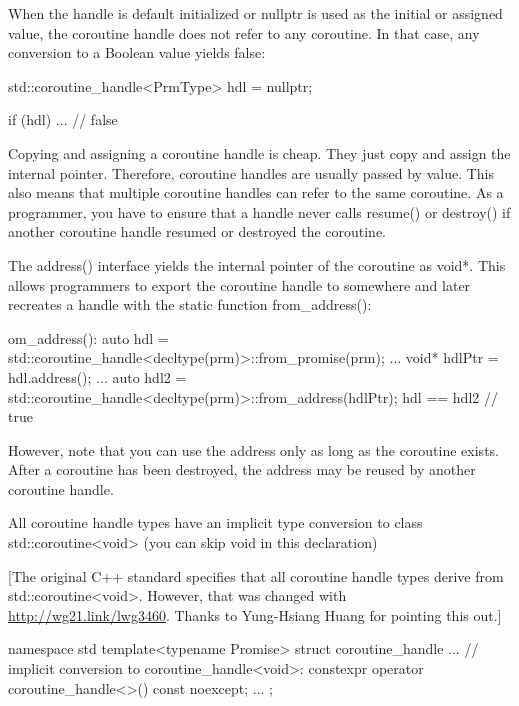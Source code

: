 When the handle is default initialized or nullptr is used as the initial or assigned value, the coroutine handle does not refer to any coroutine. In that case, any conversion to a Boolean value yields false:

\begin{cpp}
std::coroutine_handle<PrmType> hdl = nullptr;

if (hdl) ... // false
\end{cpp}

Copying and assigning a coroutine handle is cheap. They just copy and assign the internal pointer. Therefore, coroutine handles are usually passed by value. This also means that multiple coroutine handles can refer to the same coroutine. As a programmer, you have to ensure that a handle never calls resume() or destroy() if another coroutine handle resumed or destroyed the coroutine.

The address() interface yields the internal pointer of the coroutine as void*. This allows programmers to export the coroutine handle to somewhere and later recreates a handle with the static function from\_address():

\begin{cpp}
om_address():
auto hdl = std::coroutine_handle<decltype(prm)>::from_promise(prm);
...
void* hdlPtr = hdl.address();
...
auto hdl2 = std::coroutine_handle<decltype(prm)>::from_address(hdlPtr);
hdl == hdl2 // true
\end{cpp}

However, note that you can use the address only as long as the coroutine exists. After a coroutine has been destroyed, the address may be reused by another coroutine handle.


All coroutine handle types have an implicit type conversion to class std::coroutine<void> (you can skip void in this declaration)

[The original C++ standard specifies that all coroutine handle types derive from std::coroutine<void>. However, that was changed with \url{http://wg21.link/lwg3460}. Thanks to Yung-Hsiang Huang for pointing this out.]

\begin{cpp}
namespace std {
	template<typename Promise>
	struct coroutine_handle {
		...
		// implicit conversion to coroutine_handle<void>:
		constexpr operator coroutine_handle<>() const noexcept;
		...
	};
}
\end{cpp}

